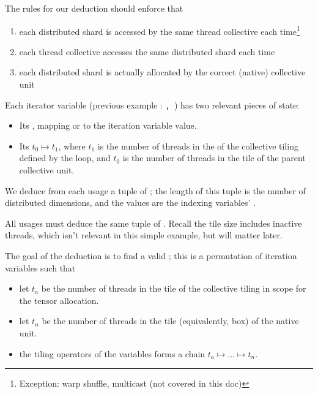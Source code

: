 \filbreak
The rules for our deduction should enforce that
\begin{enumerate}
  \item each distributed shard is accessed by the same thread collective each time\footnote{Exception: warp shuffle, multicast (not covered in this doc)}
  \filbreak
  \item each thread collective accesses the same distributed shard each time
  \filbreak
  \item each distributed shard is actually allocated by the correct (native) collective unit
\end{enumerate}

\filbreak
{}

Each  iterator variable (previous example : \texttt{, }) has two relevant pieces of state:
\begin{itemize}
  \item Its , mapping  or  to the iteration variable value.
  \filbreak
  \item Its  $t_0 \mapsto t_1$, where $t_1$ is the number of threads in the  of the collective tiling defined by the  loop, and $t_0$ is the number of threads in the tile of the parent collective unit.
\end{itemize}

\filbreak
We deduce from each usage a tuple of ; the length of this tuple is the number of distributed dimensions, and the values are the indexing variables' .



\filbreak
All usages must deduce the same tuple of .
Recall the tile size includes inactive threads, which isn't relevant in this simple example, but will matter later.

\filbreak
{}

The goal of the deduction is to find a valid ; this is a permutation of  iteration variables such that
\begin{itemize}
  \item let $t_a$ be the number of threads in the tile of the collective tiling in scope for the tensor allocation.
  \item let $t_n$ be the number of threads in the tile (equivalently, box) of the native unit.
  \item the tiling operators of the variables forms a chain $t_a \mapsto ... \mapsto t_n$.
\end{itemize}

